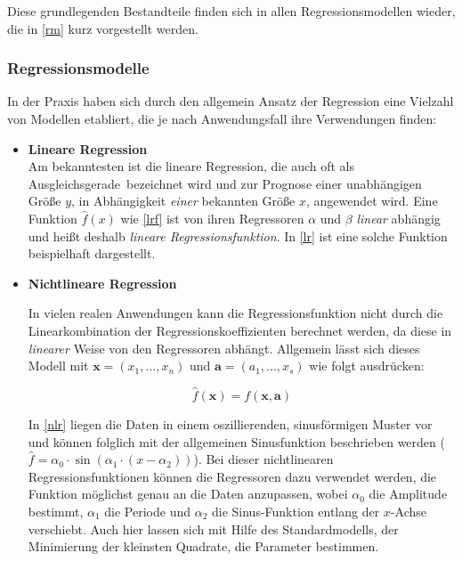 Diese grundlegenden Bestandteile finden sich in allen Regressionsmodellen wieder, die in \vref{rm} kurz vorgestellt werden. 


\subsubsection{Regressionsmodelle}\label{rm}
In der Praxis haben sich durch den allgemein Ansatz der Regression eine Vielzahl von Modellen etabliert, die je nach Anwendungsfall ihre Verwendungen finden:


\begin{itemize}


\item \textbf{Lineare Regression}
\\ Am bekanntesten ist die lineare Regression, die auch oft als \glqq Ausgleichsgerade\grqq~bezeichnet wird und zur Prognose einer unabhängigen Größe $y$, in Abhängigkeit \textit{einer} bekannten Größe $x$, angewendet wird. Eine Funktion $\hat{f}(x)$ wie \vref{lrf} ist von ihren Regressoren $\alpha$ und $\beta$ \textit{linear} abhängig und heißt deshalb \textit{lineare Regressionsfunktion}. In \vref{lr} ist eine solche Funktion beispielhaft dargestellt.




\item \textbf{Nichtlineare Regression}

In vielen realen Anwendungen kann die Regressionsfunktion nicht durch die Linearkombination der Regressionskoeffizienten berechnet werden, da diese in \textit{linearer} Weise von den Regressoren abhängt. Allgemein lässt sich dieses Modell mit $\boldsymbol{x} = (x_1,...,x_n)$ und $\boldsymbol{a} = (a_1,...,x_s)$ wie folgt ausdrücken:

\begin{equation}
	\hat{f}(\boldsymbol{x}) = f(\boldsymbol{x},\boldsymbol{a})
\end{equation}

In \vref{nlr} liegen die Daten in einem oszillierenden, sinusförmigen Muster vor und können folglich mit der allgemeinen Sinusfunktion beschrieben werden ($\hat{f} = \alpha_0 \cdot \sin(\alpha_1 \cdot (x-\alpha_2))$). Bei dieser nichtlinearen Regressionsfunktionen können die Regressoren dazu verwendet werden, die Funktion möglichst genau an die Daten anzupassen, wobei $\alpha_0$ die Amplitude bestimmt, $\alpha_1$ die Periode und $\alpha_2$ die Sinus-Funktion entlang der $x$-Achse verschiebt. Auch hier lassen sich mit Hilfe des Standardmodells, der Minimierung der kleinsten Quadrate, die Parameter bestimmen.


\end{itemize}
